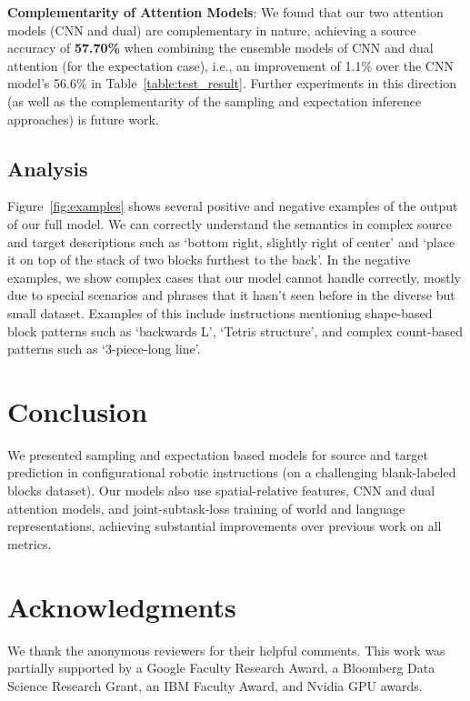 \documentclass[letterpaper]{article} %
\begin{document}
\textbf{Complementarity of Attention Models}:
We found that our two attention models (CNN and dual) are complementary in nature, achieving a source accuracy of \textbf{57.70\%} when combining the ensemble models of CNN and dual attention (for the expectation case), i.e., an improvement of 1.1\% over the CNN model's 56.6\% in Table~\ref{table:test_result}.
Further experiments in this direction (as well as the complementarity of the sampling and expectation inference approaches) is future work.



\subsection{Analysis}
Figure~\ref{fig:examples} shows several positive and negative examples of the output of our full model. We can correctly understand the semantics in complex source and target descriptions such as `bottom right, slightly right of center' and `place it on top of the stack of two blocks furthest to the back'. In the negative examples, we show complex cases that our model cannot handle correctly, mostly due to special scenarios and phrases that it hasn't seen before in the diverse but small dataset. Examples of this include instructions mentioning shape-based block patterns such as `backwards L', `Tetris structure', and complex count-based patterns such as `3-piece-long line'.


\section{Conclusion}
We presented sampling and expectation based models for source and target prediction in configurational robotic instructions (on a challenging blank-labeled blocks dataset). Our models also use spatial-relative features, CNN and dual attention models, and joint-subtask-loss training of world and language representations, achieving substantial improvements over previous work on all metrics.

\section*{Acknowledgments}
We thank the anonymous reviewers for their helpful
comments. This work was partially supported by a
Google Faculty Research Award, a Bloomberg Data Science Research Grant, an IBM Faculty
Award, and Nvidia GPU awards.
\end{document}
